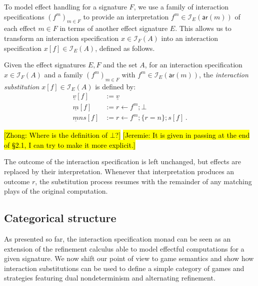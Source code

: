 \documentclass[sigplan,screen]{acmart}
\newcommand{\kw}[1]{\ensuremath{ \mathsf{#1} }}
\newcommand{\hlc}[2][yellow]{ {\sethlcolor{#1} \hl{#2}} }
\newcommand\zhong[1]{\hlc[yellow]{[Zhong: #1]}}
\newcommand\jk[1]{\hlc[pink]{[Jeremie: #1]}}
\begin{document}
To model effect handling for a signature $F$,
we use a family of interaction specifications
$(f^m)_{m \in F}$
to provide an interpretation $f^m \in \mathcal{I}_E(\kw{ar}(m))$
of each effect $m \in F$
in terms of another effect signature $E$.
This allows us to transform an interaction specification
$x \in \mathcal{I}_F(A)$
into an interaction specification
$x[f] \in \mathcal{I}_E(A)$,
defined as follows.

\begin{definition}
Given the effect signatures $E, F$ and the set $A$,
for an interaction specification $x \in \mathcal{I}_F(A)$
and a family $(f^m)_{m \in F}$ with $f^m \in \mathcal{I}_E(\kw{ar}(m))$,
the \emph{interaction substitution} $x[f] \in \mathcal{I}_E(A)$
is defined by:
\begin{align*}
  \underline{v}[f] &:= \underline{v} \\
  \underline{m}[f] &:= r \leftarrow f^m ; \bot \\
  \underline{m}ns[f] &:= r \leftarrow f^m ; \{r = n\} ; s[f] \,.
\end{align*}
\end{definition}

\zhong{Where is the definition of $\bot$?}
\jk{It is given in passing at the end of \S2.1,
  I can try to make it more explicit.}

The outcome of the interaction specification is left unchanged,
but effects are replaced by their interpretation.
Whenever that interpretation produces an outcome $r$,
the substitution process resumes with the remainder of any
matching plays of the original computation.


\subsection{Categorical structure} \label{sec:intm:cat} %

As presented so far,
the interaction specification monad
can be seen as an extension of the refinement calculus
able to model effectful computations
for a given signature.
We now shift our point of view to game semantics
and show how interaction substitutions
can be used to define a simple category of games and strategies
featuring dual nondeterminism and alternating refinement.
\end{document}
